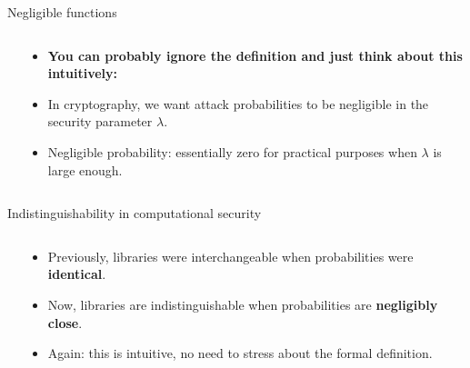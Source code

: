 \documentclass[aspectratio=169, lualatex, handout]{beamer}
\begin{document}
\begin{frame}{Negligible functions}
	\begin{columns}[c]
		\begin{column}{0.5\textwidth}
		\end{column}
		\begin{column}{0.5\textwidth}
			\begin{itemize}
				\item \textbf{You can probably ignore the definition and just think about this intuitively:}
				\item In cryptography, we want attack probabilities to be negligible in the security parameter $\lambda$.
				\item Negligible probability: essentially zero for practical purposes when $\lambda$ is large enough.
			\end{itemize}
		\end{column}
	\end{columns}
\end{frame}

\begin{frame}{Indistinguishability in computational security}
	\begin{columns}[c]
		\begin{column}{0.6\textwidth}
		\end{column}
		\begin{column}{0.4\textwidth}
			\begin{itemize}
				\item Previously, libraries were interchangeable when probabilities were \textbf{identical}.
				\item Now, libraries are indistinguishable when probabilities are \textbf{negligibly close}.
				\item Again: this is intuitive, no need to stress about the formal definition.
			\end{itemize}
		\end{column}
	\end{columns}
\end{frame}
\end{document}
